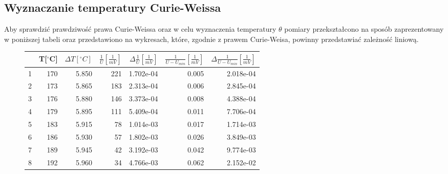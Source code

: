 \documentclass[a4paper,10pt]{article}
\begin{document}
\subsection{Wyznaczanie temperatury Curie-Weissa}
Aby sprawdzić prawdziwość prawa Curie-Weissa oraz w celu wyznaczenia temperatury $\theta$ pomiary przekształcono na sposób zaprezentowany w poniższej tabeli oraz przedstawiono na wykresach, które, zgodnie z prawem Curie-Weisa, powinny przedstawiać zależność liniową.
\begin{figure}
\begin{tabular}{lrrrrrr}
\toprule
{} &  T[$^\circ $C] &  $\Delta T [^\circ C]$ &  $\frac{1}{U}[\frac{1}{mV}]$ &  $\Delta \frac{1}{U}[\frac{1}{mV}]$ &  $\frac{1}{U-U_{min}}[\frac{1}{mV}]$ &  $\Delta \frac{1}{U-U_{min}}[\frac{1}{mV}]$ \\
\midrule
1 &            170 &                  5.850 &                          221 &                           1.702e-04 &                                0.005 &                                   2.018e-04 \\
2 &            173 &                  5.865 &                          183 &                           2.313e-04 &                                0.006 &                                   2.845e-04 \\
3 &            176 &                  5.880 &                          146 &                           3.373e-04 &                                0.008 &                                   4.388e-04 \\
4 &            179 &                  5.895 &                          111 &                           5.409e-04 &                                0.011 &                                   7.706e-04 \\
5 &            183 &                  5.915 &                           78 &                           1.014e-03 &                                0.017 &                                   1.714e-03 \\
6 &            186 &                  5.930 &                           57 &                           1.802e-03 &                                0.026 &                                   3.849e-03 \\
7 &            189 &                  5.945 &                           42 &                           3.192e-03 &                                0.042 &                                   9.774e-03 \\
8 &            192 &                  5.960 &                           34 &                           4.766e-03 &                                0.062 &                                   2.152e-02 \\

\end{tabular}
\end{figure}
\end{document}

